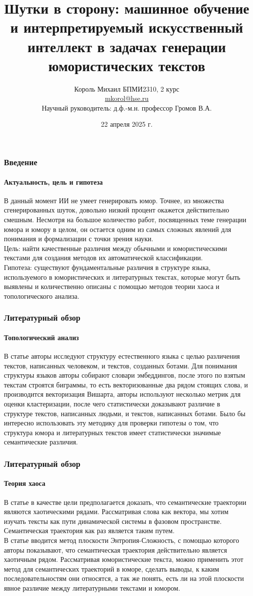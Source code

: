\documentclass[aspectratio=169]{beamer}
\title[Заголовок]{Шутки в сторону: машинное обучение и интерпретируемый искусственный интеллект в задачах генерации юмористических текстов}
\author[Имя автора]{Король Михаил БПМИ2310, 2 курс \\ \smallskip \scriptsize \url{mkorol@hse.ru} \\{Научный руководитель: д.ф.-м.н. профессор Громов В.А.}}
\institute{Факультет компьютерных наук}
\date{22 апреля 2025 г.}
\begin{document}

\frame[plain]{\titlepage}	%

\begin{frame}
\frametitle{Введение}
\framesubtitle{Актуальность, цель и гипотеза}
	В данный момент ИИ не умеет генерировать юмор. Точнее, из множества сгенерированных шуток, довольно низкий процент окажется действительно смешным. Несмотря на большое количество работ, посвященных теме генерации юмора и юмору в целом, он остается одним из самых сложных явлений для понимания и формализации с точки зрения науки. \\
	Цель: найти качественные различия между обычными и юмористическими текстами для создания методов их автоматической классификации.\\
	Гипотеза: существуют фундаментальные различия в структуре языка, используемого в юмористических и литературных текстах, которые могут быть выявлены и количественно описаны с помощью методов теории хаоса и топологического анализа.
	
\end{frame}

\begin{frame}
\frametitle{Литературный обзор}
\framesubtitle{Топологический анализ}

В статье \cite{gromov_spot_2024} авторы исследуют структуру естественного языка с целью различения текстов, написанных человеком, и текстов, созданных ботами. Для понимания структуры языков авторы собирают словари эмбеддингов, после этого по взятым текстам строятся биграммы, то есть векторизованные два рядом стоящих слова, и производится векторизация Вишарта, авторы используют несколько метрик для оценки кластеризации, после чего статистически доказывают различие в структуре текстов, написанных людьми, и текстов, написанных ботами. Было бы интересно использовать эту методику для проверки гипотезы о том, что структура юмора и литературных текстов имеет статистически значимые семантические различия.


\end{frame}

\begin{frame}
\frametitle{Литературный обзор}
\framesubtitle{Теория хаоса}

В статье \cite{gromov_semantic_2023} в качестве цели предполагается доказать, что семантические траектории являются хаотическими рядами. Рассматривая слова как вектора, мы хотим изучать тексты как пути динамической системы в фазовом пространстве. Семантическая траектория как раз является таким путем. \\
В статье вводится метод плоскости Энтропия-Сложность, с помощью которого авторы показывают, что семантическая траектория действительно является хаотичным рядом. Рассматривая юмористические текста, можно применить этот метод для семантических траекторий в юморе, сделать выводы, к каким последовательностям они относятся, а так же понять, есть ли на этой плоскости явное различие между литературными текстами и юмором.

\end{frame}
\end{document}
